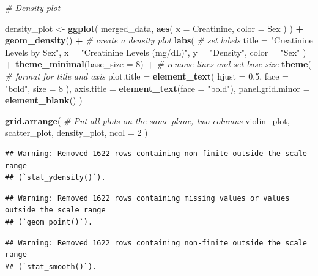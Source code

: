 \documentclass[
]{article}
\newenvironment{Shaded}{\begin{snugshade}}{\end{snugshade}}
\newcommand{\AttributeTok}[1]{\textcolor[rgb]{0.13,0.29,0.53}{#1}}
\newcommand{\CommentTok}[1]{\textcolor[rgb]{0.56,0.35,0.01}{\textit{#1}}}
\newcommand{\DecValTok}[1]{\textcolor[rgb]{0.00,0.00,0.81}{#1}}
\newcommand{\FloatTok}[1]{\textcolor[rgb]{0.00,0.00,0.81}{#1}}
\newcommand{\FunctionTok}[1]{\textcolor[rgb]{0.13,0.29,0.53}{\textbf{#1}}}
\newcommand{\NormalTok}[1]{#1}
\newcommand{\OtherTok}[1]{\textcolor[rgb]{0.56,0.35,0.01}{#1}}
\newcommand{\SpecialCharTok}[1]{\textcolor[rgb]{0.81,0.36,0.00}{\textbf{#1}}}
\newcommand{\StringTok}[1]{\textcolor[rgb]{0.31,0.60,0.02}{#1}}
\begin{document}
\begin{Shaded}
\begin{Highlighting}[]
  
\CommentTok{\# Density plot}
  
\NormalTok{density\_plot }\OtherTok{\textless{}{-}} \FunctionTok{ggplot}\NormalTok{(}
\NormalTok{  merged\_data,}
  \FunctionTok{aes}\NormalTok{(}
    \AttributeTok{x =}\NormalTok{ Creatinine,}
    \AttributeTok{color =}\NormalTok{ Sex}
\NormalTok{  )}
\NormalTok{  ) }\SpecialCharTok{+}
  \FunctionTok{geom\_density}\NormalTok{() }\SpecialCharTok{+} \CommentTok{\# create a density plot }
  \FunctionTok{labs}\NormalTok{( }\CommentTok{\# set labels }
    \AttributeTok{title =} \StringTok{"Creatinine Levels by Sex"}\NormalTok{,}
    \AttributeTok{x =} \StringTok{"Creatinine Levels (mg/dL)"}\NormalTok{,}
    \AttributeTok{y =} \StringTok{"Density"}\NormalTok{,}
    \AttributeTok{color =} \StringTok{"Sex"}
\NormalTok{  ) }\SpecialCharTok{+}
  \FunctionTok{theme\_minimal}\NormalTok{(}\AttributeTok{base\_size =} \DecValTok{8}\NormalTok{) }\SpecialCharTok{+} \CommentTok{\# remove lines and set base size}
  \FunctionTok{theme}\NormalTok{( }\CommentTok{\# format for title and axis}
    \AttributeTok{plot.title =} \FunctionTok{element\_text}\NormalTok{(}
      \AttributeTok{hjust =} \FloatTok{0.5}\NormalTok{,}
      \AttributeTok{face =} \StringTok{"bold"}\NormalTok{,}
      \AttributeTok{size =} \DecValTok{8}
\NormalTok{    ),}
    \AttributeTok{axis.title =} \FunctionTok{element\_text}\NormalTok{(}\AttributeTok{face =} \StringTok{"bold"}\NormalTok{),}
    \AttributeTok{panel.grid.minor =} \FunctionTok{element\_blank}\NormalTok{()}
\NormalTok{  )}
  
  
\FunctionTok{grid.arrange}\NormalTok{( }\CommentTok{\# Put all plots on the same plane, two columns }
\NormalTok{    violin\_plot,}
\NormalTok{    scatter\_plot,}
\NormalTok{    density\_plot,}
    \AttributeTok{ncol =} \DecValTok{2}
\NormalTok{  )}
\end{Highlighting}
\end{Shaded}

\begin{verbatim}
## Warning: Removed 1622 rows containing non-finite outside the scale range
## (`stat_ydensity()`).
\end{verbatim}

\begin{verbatim}
## Warning: Removed 1622 rows containing missing values or values outside the scale range
## (`geom_point()`).
\end{verbatim}

\begin{verbatim}
## Warning: Removed 1622 rows containing non-finite outside the scale range
## (`stat_smooth()`).
\end{verbatim}
\end{document}
